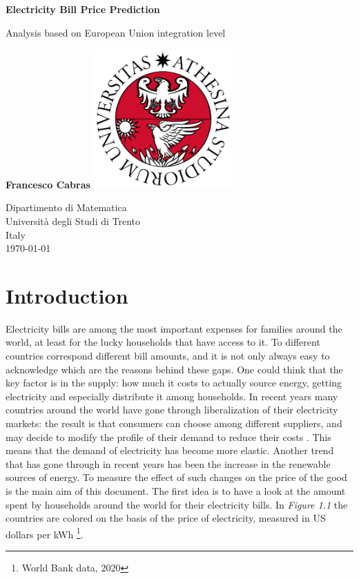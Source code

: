 \documentclass{book}
\begin{document}
\begin{titlepage}
   \begin{center}
       \vspace*{1cm}

       \textbf{Electricity Bill Price Prediction}

       \vspace{0.5cm}
       Analysis based on European Union integration level
            
       \vspace{1.5cm}
       \textbf{Francesco Cabras}
       \vfill
       \includegraphics[width=0.4\textwidth]{Images/unitn.png}            
       \vspace{0.8cm}
            
       Dipartimento di Matematica\\
       Università degli Studi di Trento\\
       Italy\\
       \today
            
   \end{center}
\end{titlepage}

\tableofcontents

\chapter{Introduction}

Electricity bills are among the most important expenses for families around the world, at least for the lucky households that have access to it. To different countries correspond different bill amounts, and it is not only always easy to acknowledge which are the reasons behind these gaps. One could think that the key factor is in the supply: how much it costs to actually source energy, getting electricity and especially distribute it among households. In recent years many countries around the world have gone through liberalization of their electricity markets: the result is that consumers can choose among different suppliers, and may decide to modify the profile of their demand to reduce their costs \cite{867149}. This means that the demand of electricity has become more elastic. Another trend that has gone through in recent years has been the increase in the renewable sources of energy. To measure the effect of such changes on the price of the good is the main aim of this document. The first idea is to have a look at the amount spent by households around the world for their electricity bills.  In \textit{Figure 1.1} the countries are colored on the basis of the price of electricity, measured in US dollars per kWh \footnote{World Bank data, 2020}.
\end{document}

